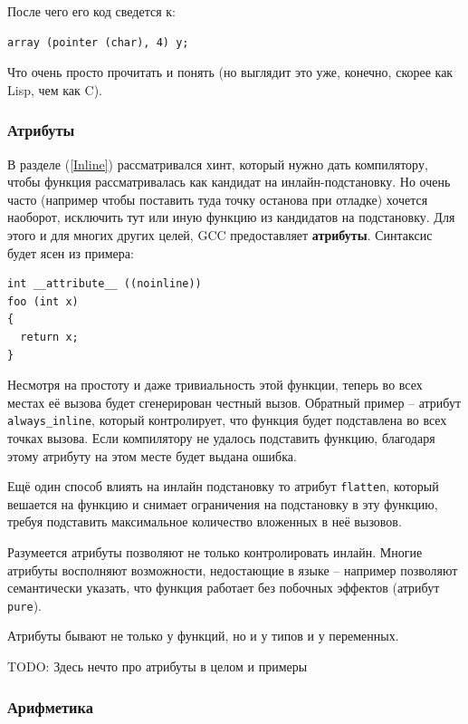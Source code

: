 \documentclass[a4paper,12pt,oneside]{article}
\begin{document}
После чего его код сведется к:

\begin{lstlisting}
array (pointer (char), 4) y;
\end{lstlisting}

Что очень просто прочитать и понять (но выглядит это уже, конечно, скорее как Lisp, чем как C).

\subsubsection{Атрибуты}

В разделе (\ref{Inline}) рассматривался хинт, который нужно дать компилятору, чтобы функция рассматривалась как кандидат на инлайн-подстановку. Но очень часто (например чтобы поставить туда точку останова при отладке) хочется наоборот, исключить тут или иную функцию из кандидатов на подстановку. Для этого и для многих других целей, GCC предоставляет \textbf{атрибуты}. Синтаксис будет ясен из примера:

\begin{lstlisting}
int __attribute__ ((noinline))
foo (int x)
{
  return x;
}
\end{lstlisting}

Несмотря на простоту и даже тривиальность этой функции, теперь во всех местах её вызова будет сгенерирован честный вызов. Обратный пример -- атрибут \lstinline!always_inline!, который контролирует, что функция будет подставлена во всех точках вызова. Если компилятору не удалось подставить функцию, благодаря этому атрибуту на этом месте будет выдана ошибка.

Ещё один способ влиять на инлайн подстановку то атрибут \lstinline!flatten!, который вешается на функцию и снимает ограничения на подстановку в эту функцию, требуя подставить максимальное количество вложенных в неё вызовов.

Разумеется атрибуты позволяют не только контролировать инлайн. Многие атрибуты восполняют возможности, недостающие в языке -- например позволяют семантически указать, что функция работает без побочных эффектов (атрибут \lstinline!pure!).

Атрибуты бывают не только у функций, но и у типов и у переменных.

TODO: Здесь нечто про атрибуты в целом и примеры 

\subsubsection{Арифметика}
\end{document}
